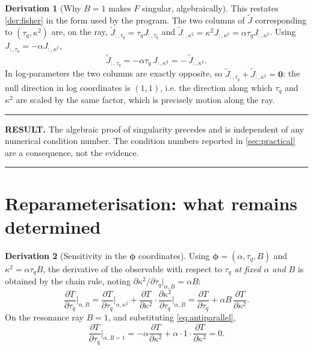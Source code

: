 \documentclass[11pt,a4paper]{article}
\theoremstyle{definition}
\newtheorem{derivationx}{Derivation}[section]
\newenvironment{resultbox}%
  {\par\medskip\noindent\begin{minipage}{\linewidth}%
   \rule{\linewidth}{1.0pt}\par\noindent\textbf{RESULT.}\enspace}%
  {\par\rule{\linewidth}{1.0pt}\end{minipage}\par\medskip}
\newcommand{\tq}{\tau_{q}}
\newcommand{\kk}{\kappa^{2}}
\newcommand{\Bnum}{B}
\begin{document}
\begin{derivationx}[Why $\Bnum=1$ makes $F$ singular, algebraically]
\label{der:why-singular}
This restates \cref{der:fisher} in the form used by the program. The two
columns of $\tilde J$ corresponding to $(\tq,\kk)$ are, on the ray,
$\tilde J_{:,\tq}=\tq J_{:,\tq}$ and $\tilde J_{:,\kk}=\kk J_{:,\kk}
=\alpha\tq J_{:,\kk}$. Using $J_{:,\tq}=-\alpha J_{:,\kk}$,
\begin{equation}
  \tilde J_{:,\tq} = -\alpha\tq\, J_{:,\kk} = -\,\tilde J_{:,\kk} .
  \label{eq:logJ-dependence}
\end{equation}
In log-parameters the two columns are exactly opposite, so
$\tilde J_{:,\tq}+\tilde J_{:,\kk}=\bm{0}$: the null direction in log
coordinates is $(1,1)$, i.e. the direction along which $\tq$ and $\kk$ are
scaled by the same factor, which is precisely motion along the ray.
\end{derivationx}

\begin{resultbox}
The algebraic proof of singularity precedes and is independent of any numerical
condition number. The condition numbers reported in \cref{sec:practical} are a
consequence, not the evidence.
\end{resultbox}

\section{Reparameterisation: what remains determined}
\label{sec:reparam}

\begin{derivationx}[Sensitivity in the $\bm{\phi}$ coordinates]
\label{der:reparam-sens}
Using $\bm{\phi}=(\alpha,\tq,\Bnum)$ and $\kk=\alpha\tq\Bnum$, the derivative
of the observable with respect to $\tq$ \emph{at fixed $\alpha$ and $\Bnum$} is
obtained by the chain rule, noting
$\partial\kk/\partial\tq|_{\alpha,\Bnum}=\alpha\Bnum$:
\begin{equation}
  \frac{\partial T}{\partial \tq}\bigg|_{\alpha,\Bnum}
   = \frac{\partial T}{\partial \tq}\bigg|_{\alpha,\kk}
   + \frac{\partial T}{\partial \kk}\cdot
     \frac{\partial \kk}{\partial \tq}\bigg|_{\alpha,\Bnum}
   = \frac{\partial T}{\partial \tq}
   + \alpha\Bnum\,\frac{\partial T}{\partial \kk} .
  \label{eq:reparam-chain}
\end{equation}
On the resonance ray $\Bnum=1$, and substituting \eqref{eq:antiparallel},
\begin{equation}
  \frac{\partial T}{\partial \tq}\bigg|_{\alpha,\Bnum=1}
   = -\alpha\frac{\partial T}{\partial \kk}
     + \alpha\cdot1\cdot\frac{\partial T}{\partial \kk}
   = 0 .
  \label{eq:reparam-degenerate}
\end{equation}
\end{derivationx}
\end{document}

